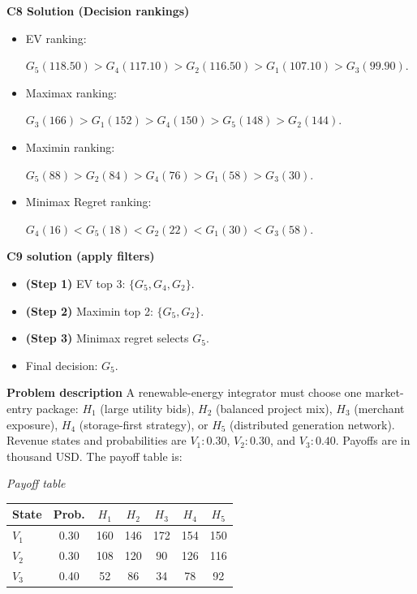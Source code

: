 \begin{ExamProblems}
		\textbf{C8 Solution (Decision rankings)}\par
		\begin{itemize}
			\item EV ranking: \par $G_5(118.50)>G_4(117.10)>G_2(116.50)>G_1(107.10)>G_3(99.90)$.
			\item Maximax ranking:\par $G_3(166)>G_1(152)>G_4(150)>G_5(148)>G_2(144)$.
			\item Maximin ranking: \par $G_5(88)>G_2(84)>G_4(76)>G_1(58)>G_3(30)$.
			\item Minimax Regret ranking:\par $G_4(16)<G_5(18)<G_2(22)<G_1(30)<G_3(58)$.
		\end{itemize}
		
		\textbf{C9 solution (apply filters)}\par
		\begin{itemize}
			\item \textbf{(Step 1)} EV top 3: $\{G_5,G_4,G_2\}$.
			\item \textbf{(Step 2)} Maximin top 2: $\{G_5,G_2\}$.
			\item \textbf{(Step 3)} Minimax regret selects $G_5$.
			\item Final decision: $G_5$.
		\end{itemize}
		
		\newpage
		\item
		\textbf{Problem description}
		A renewable-energy integrator must choose one market-entry package: $H_1$ (large utility bids), $H_2$ (balanced project mix), $H_3$ (merchant exposure), $H_4$ (storage-first strategy), or $H_5$ (distributed generation network).
		Revenue states and probabilities are $V_1:0.30$, $V_2:0.30$, and $V_3:0.40$. Payoffs are in thousand USD. The payoff table is:
		
		\begin{center}
			\textit{Payoff table} \\
			\begin{tabular}{l c c c c c c}
				\hline
				State& Prob. & $H_1$ & $H_2$ & $H_3$ & $H_4$ & $H_5$ \\
				\hline
				$V_1$ & 0.30 & 160 & 146 & 172 & 154 & 150 \\
				$V_2$ & 0.30 & 108 & 120 & 90 & 126 & 116 \\
				$V_3$ & 0.40 & 52 & 86 & 34 & 78 & 92 \\
				\hline
			\end{tabular}
		\end{center}
		

\end{ExamProblems}

